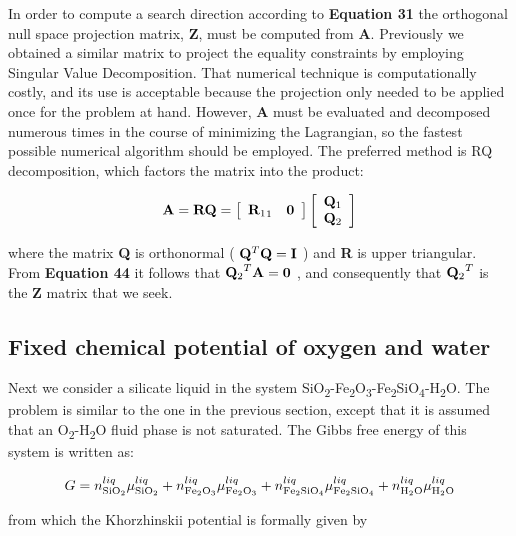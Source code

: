 \documentclass[11pt, titlepage, twoside]{article}
\begin{document}
In order to compute a search direction according to \textbf{Equation 31} the orthogonal null space projection matrix, \textbf{Z}, must be computed from \textbf{A}. Previously we obtained a similar matrix to project the equality constraints by employing Singular Value Decomposition. That numerical technique is computationally costly, and its use is acceptable because the projection only needed to be applied once for the problem at hand. However, \textbf{A} must be evaluated and decomposed numerous times in the course of minimizing the Lagrangian, so the fastest possible numerical algorithm should be employed. The preferred method is RQ decomposition, which factors the matrix into the product:


\begin{MPEquation}[!ht]
\begin{equation}
{\bf{A}} = {\bf{RQ}} = \left[ {\begin{array}{*{20}{c}}
{{{\bf{R}}_1}_1}&{\bf{0}}
\end{array}} \right]\left[ {\begin{array}{*{20}{c}}
{{{\bf{Q}}_1}}\\
{{{\bf{Q}}_2}}
\end{array}} \right]
\end{equation}
\label{MPEquationElement:9EB740CE-2A66-4AD1-D5DD-581B818B8B39}
\end{MPEquation}
where the matrix \textbf{Q} is orthonormal ( ${{\bf{Q}}^T}{\bf{Q}} = {\bf{I}}$ ) and \textbf{R} is upper triangular. From \textbf{Equation 44} it follows that ${{\bf{Q}}_2}^T{\bf{A}} = {\bf{0}}$ , and consequently that ${{\bf{Q}}_2}^T$ is the \textbf{Z} matrix that we seek.


\subsection{Fixed chemical potential of oxygen and water}\label{MPSection:99975B8E-4502-4E2F-AD38-2A5CC95F68F4}

Next we consider a silicate liquid in the system SiO\textsubscript{2}-Fe\textsubscript{2}O\textsubscript{3}-Fe\textsubscript{2}SiO\textsubscript{4}-H\textsubscript{2}O. The problem is similar to the one in the previous section, except that it is assumed that an O\textsubscript{2}-H\textsubscript{2}O fluid phase is not saturated. The Gibbs free energy of this system is written as:


\begin{MPEquation}[!ht]
\begin{equation}
G = n_{{\rm{Si}}{{\rm{O}}_2}}^{liq}\mu _{{\rm{Si}}{{\rm{O}}_2}}^{liq} + n_{{\rm{F}}{{\rm{e}}_2}{{\rm{O}}_3}}^{liq}\mu _{{\rm{F}}{{\rm{e}}_2}{{\rm{O}}_3}}^{liq} + n_{{\rm{F}}{{\rm{e}}_{\rm{2}}}{\rm{Si}}{{\rm{O}}_4}}^{liq}\mu _{{\rm{F}}{{\rm{e}}_{\rm{2}}}{\rm{Si}}{{\rm{O}}_4}}^{liq} + n_{{{\rm{H}}_2}{\rm{O}}}^{liq}\mu _{{{\rm{H}}_2}{\rm{O}}}^{liq}
\end{equation}
\label{MPEquationElement:539341CA-CB1E-4B4E-9493-E4CFBD8FB3E8}
\end{MPEquation}
from which the Khorzhinskii potential is formally given by
\end{document}
